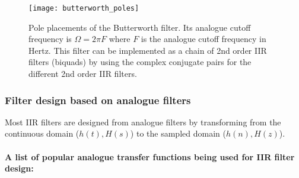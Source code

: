 \documentclass[12pt,a4paper]{article}
\begin{document}
\begin{figure}[!hbt]
\begin{center}
\mbox{\texttt{[image: butterworth\_poles]}}
\end{center}
\caption{Pole placements of the Butterworth filter. Its analogue
  cutoff frequency is $\Omega = 2\pi F$ where $F$ is the
  analogue cutoff frequency in Hertz. This filter can be implemented
  as a chain of 2nd order IIR filters (biquads) by using the
  complex conjugate pairs for the different 2nd order IIR filters.
\label{butterworth_poles}}
\end{figure}



\subsubsection{Filter design based on analogue filters}
Most IIR filters are designed from analogue filters by transforming
from the continuous domain ($h(t),H(s)$) to the sampled domain
($h(n),H(z)$).

\paragraph{A list of popular analogue transfer functions being
used for IIR filter design:}
\end{document}
